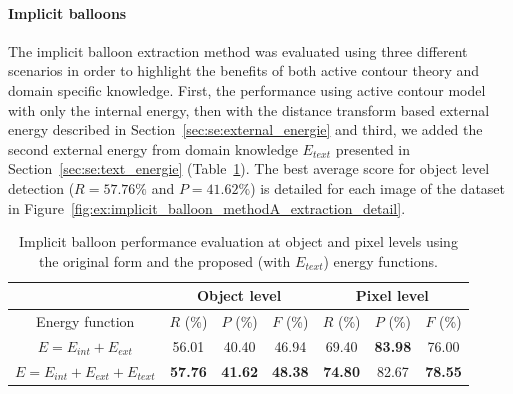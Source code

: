 

\paragraph{Implicit balloons} %
\label{par:ex:implicit_balloons_reminder}

The implicit balloon extraction method was evaluated using three different scenarios in order to highlight the benefits of both active contour theory and domain specific knowledge.
First, the performance using active contour model with only the internal energy, then with the distance transform based external energy described in Section~\ref{sec:se:external_energie} and third, we added the second external energy from domain knowledge $E_{text}$ presented in Section~\ref{sec:se:text_energie} (Table~\ref{tab:ex:implicit_balloon_performance_object_pixel_comparison}).
The best average score for object level detection ($R=57.76\%$ and $P=41.62\%$) is detailed for each image of the dataset in Figure~\ref{fig:ex:implicit_balloon_methodA_extraction_detail}.



\begin{table}[h]
  \normalsize
  \centering
  \caption[Implicit balloon performance evaluation at object and pixel levels using the original form and the proposed energy functions]{Implicit balloon performance evaluation at object and pixel levels using the original form and the proposed (with $E_{text}$) energy functions.}
  \begin{tabular}{|c|c|c|c|c|c|c|}
  \hline
    & \multicolumn{3}{|c|}{Object level}  & \multicolumn{3}{|c|}{Pixel level}   \\
  \hline
  Energy function  &  $ R$ (\%)  & $P$ (\%)& $F$ (\%)   &  $R$ (\%)  & $P$ (\%)   & $F$ (\%)\\
  \hline

   $E = E_{int} + E_{ext}$    & 56.01       & 40.40     & 46.94       & 69.40  & \textbf{83.98} & 76.00   \\
  \hline
  $E = E_{int} + E_{ext} + E_{text}$   & \textbf{57.76} & \textbf{41.62} & \textbf{48.38} & \textbf{74.80} & 82.67 & \textbf{78.55}    \\
  \hline
  \end{tabular}
      \label{tab:ex:implicit_balloon_performance_object_pixel_comparison}
\end{table}%

